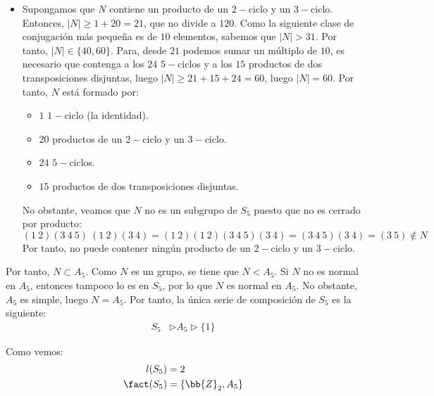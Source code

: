 \begin{ejercicio}
\begin{enumerate}
\begin{itemize}
            \item Supongamos que $N$ contiene un producto de un $2-$ciclo y un $3-$ciclo. Entonces, $|N|\geq 1+20=21$, que no divide a $120$. Como la siguiente clase de conjugación más pequeña es de $10$ elementos, sabemos que $|N|>31$. Por tanto, $|N|\in \{40,60\}$. Para, desde $21$ podemos sumar un múltiplo de $10$, es necesario que contenga a los $24$ $5-$ciclos y a los $15$ productos de dos transposiciones disjuntas, luego $|N|\geq 21+15+24=60$, luego $|N|=60$. Por tanto, $N$ está formado por:
            \begin{itemize}
                \item $1$ $1-$ciclo (la identidad).
                \item $20$ productos de un $2-$ciclo y un $3-$ciclo.
                \item $24$ $5-$ciclos.
                \item $15$ productos de dos transposiciones disjuntas.
            \end{itemize}

            No obstante, veamos que $N$ no es un subgrupo de $S_5$ puesto que no es cerrado por producto:
            \begin{equation*}
                (1\ 2)(3\ 4\ 5)\ (1\ 2)(3\ 4) = (1\ 2)(1\ 2)(3\ 4\ 5)(3\ 4)
                = (3\ 4\ 5)(3\ 4) = (3\ 5)\notin N
            \end{equation*}
            Por tanto, no puede contener ningún producto de un $2-$ciclo y un $3-$ciclo.
        \end{itemize}
        Por tanto, $N\subset A_5$. Como $N$ es un grupo, se tiene que $N<A_5$. Si $N$ no es normal en $A_5$, entonces tampoco lo es en $S_5$, por lo que $N$ es normal en $A_5$. No obstante, $A_5$ es simple, luego $N=A_5$.
        Por tanto, la única serie de composición de $S_5$ es la siguiente:
        \begin{align*}
            S_5 &\rhd A_5 \rhd \{1\}
        \end{align*}

        Como vemos:
        \begin{align*}
            l(S_5) &= 2 \\
            \fact(S_5) &= \{\bb{Z}_2, A_5\}
        \end{align*}
    \end{enumerate}
\end{ejercicio}

